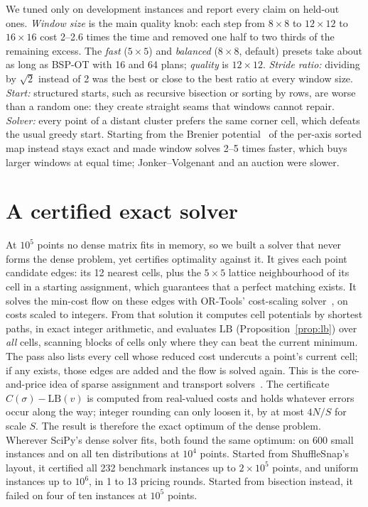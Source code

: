 \documentclass[11pt]{article}
\newcommand{\ShuffleSnap}{ShuffleSnap}
\begin{document}
We tuned only on development instances and report every claim on held-out ones.
\emph{Window size} is the main quality knob: each step from $8\times8$ to $12\times12$ to
$16\times16$ cost 2--2.6 times the time and removed one half to two thirds of the remaining
excess. The \emph{fast} ($5\times5$) and \emph{balanced} ($8\times8$, default) presets take
about as long as BSP-OT with 16 and 64 plans; \emph{quality} is $12\times12$. \emph{Stride ratio:}
dividing by $\sqrt2$ instead of 2 was the best or close to the best ratio at every window
size. \emph{Start:} structured starts, such as
recursive bisection or sorting by rows, are worse than a random one: they create straight
seams that windows cannot repair. \emph{Solver:} every point of a distant cluster prefers
the same corner cell, which defeats the usual greedy start. Starting from the Brenier
potential~\citep{brenier1991polar} of the per-axis sorted map instead stays exact and made
window solves 2--5 times faster, which buys larger windows at equal time;
Jonker--Volgenant and an auction were slower.

\section{A certified exact solver}
\label{sec:exact}

At $10^5$ points no dense matrix fits in memory, so we built a solver that never forms the
dense problem, yet certifies optimality against it. It gives each point candidate edges:
its 12 nearest cells, plus the $5\times5$ lattice neighbourhood of its cell in a starting
assignment, which guarantees that a perfect matching exists. It solves the min-cost flow on
these edges with OR-Tools' cost-scaling solver~\citep{ortools}, on costs scaled to integers.
From that solution it computes cell potentials by shortest paths, in exact integer
arithmetic, and evaluates $\mathrm{LB}$ (Proposition~\ref{prop:lb}) over \emph{all} cells,
scanning blocks of cells only where they can beat the current minimum. The pass also lists
every cell whose reduced cost undercuts a point's current cell; if any exists, those edges
are added and the flow is solved again. This is the core-and-price idea of sparse
assignment and transport solvers~\citep{volgenant1996linear,schmitzer2016sparse}. The
certificate $C(\sigma)-\mathrm{LB}(v)$ is computed from real-valued costs and holds whatever
errors occur along the way; integer rounding can only loosen it, by at most $4N/S$ for scale
$S$. The result is therefore the exact optimum of the dense problem. Wherever SciPy's dense
solver fits, both found the same optimum: on 600 small instances and on all ten
distributions at $10^4$ points. Started from
\ShuffleSnap's layout, it certified all 232 benchmark instances up to $2\times10^5$ points,
and uniform instances up to $10^6$, in 1 to 13 pricing rounds. Started from bisection
instead, it failed on four of ten instances at $10^5$ points.
\end{document}
